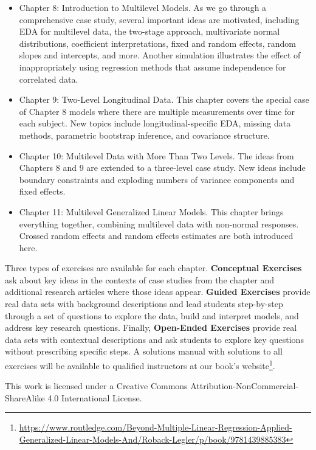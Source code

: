 \documentclass[
]{krantz}
\renewcommand{\href}[2]{#2\footnote{\url{#1}}}
\begin{document}
\begin{itemize}
\item
  Chapter 8: Introduction to Multilevel Models. As we go through a comprehensive case study, several important ideas are motivated, including EDA for multilevel data, the two-stage approach, multivariate normal distributions, coefficient interpretations, fixed and random effects, random slopes and intercepts, and more. Another simulation illustrates the effect of inappropriately using regression methods that assume independence for correlated data.
\item
  Chapter 9: Two-Level Longitudinal Data. This chapter covers the special case of Chapter 8 models where there are multiple measurements over time for each subject. New topics include longitudinal-specific EDA, missing data methods, parametric bootstrap inference, and covariance structure.
\item
  Chapter 10: Multilevel Data with More Than Two Levels. The ideas from Chapters 8 and 9 are extended to a three-level case study. New ideas include boundary constraints and exploding numbers of variance components and fixed effects.
\item
  Chapter 11: Multilevel Generalized Linear Models. This chapter brings everything together, combining multilevel data with non-normal responses. Crossed random effects and random effects estimates are both introduced here.
\end{itemize}

Three types of exercises are available for each chapter. \textbf{Conceptual Exercises} ask about key ideas in the contexts of case studies from the chapter and additional research articles where those ideas appear. \textbf{Guided Exercises} provide real data sets with background descriptions and lead students step-by-step through a set of questions to explore the data, build and interpret models, and address key research questions. Finally, \textbf{Open-Ended Exercises} provide real data sets with contextual descriptions and ask students to explore key questions without prescribing specific steps. A solutions manual with solutions to all exercises will be available to qualified instructors at our \href{https://www.routledge.com/Beyond-Multiple-Linear-Regression-Applied-Generalized-Linear-Models-And/Roback-Legler/p/book/9781439885383}{book's website}.

This work is licensed under a Creative Commons Attribution-NonCommercial-ShareAlike 4.0 International License.
\end{document}
